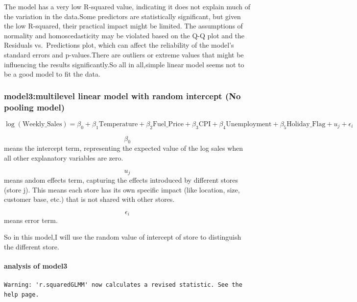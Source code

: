 \documentclass[
  letterpaper,
  DIV=11,
  numbers=noendperiod]{scrartcl}
\let\oldparagraph\paragraph
\renewcommand{\paragraph}[1]{\oldparagraph{#1}\mbox{}}
\begin{document}
The model has a very low R-squared value, indicating it does not explain
much of the variation in the data.Some predictors are statistically
significant, but given the low R-squared, their practical impact might
be limited. The assumptions of normality and homoscedasticity may be
violated based on the Q-Q plot and the Residuals vs.~Predictions plot,
which can affect the reliability of the model's standard errors and
p-values.There are outliers or extreme values that might be influencing
the results significantly.So all in all,simple linear model seems not to
be a good model to fit the data.

\hypertarget{model3multilevel-linear-model-with-random-intercept-no-pooling-model}{%
\subsubsection{model3:multilevel linear model with random intercept (No
pooling
model)}\label{model3multilevel-linear-model-with-random-intercept-no-pooling-model}}

\[\log(\text{Weekly_Sales}) = \beta_0 + \beta_1 \text{Temperature} + \beta_2 \text{Fuel_Price} + \beta_3 \text{CPI} + \beta_4 \text{Unemployment} + \beta_5 \text{Holiday_Flag} + u_j + \epsilon_i\]

\[\beta_0\] means the intercept term, representing the expected value of
the log sales when all other explanatory variables are zero.

\[u_j\] means andom effects term, capturing the effects introduced by
different stores (store j). This means each store has its own specific
impact (like location, size, customer base, etc.) that is not shared
with other stores.

\[\epsilon_i\] means error term.

So in this model,I will use the random value of intercept of store to
distinguish the different store.

\hypertarget{analysis-of-model3}{%
\paragraph{analysis of model3}\label{analysis-of-model3}}

\begin{verbatim}
Warning: 'r.squaredGLMM' now calculates a revised statistic. See the help page.
\end{verbatim}
\end{document}
